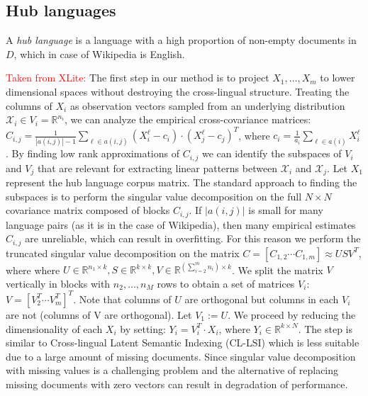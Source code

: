 \documentclass[twoside,11pt]{article}
\newcommand{\oldText}[1]{\textcolor{red}{#1:}\color{blue}}
\newcommand{\RR}{\mathbb{R}}
\begin{document}
\subsection{Hub languages}

A \emph{hub language} is a language with a high proportion of non-empty documents in $D$, which in case of Wikipedia is English.

{\oldText{Taken from XLite}
The first step in our method is to project $X_1, \ldots, X_m$ to lower dimensional spaces without destroying the cross-lingual structure. Treating the columns of $X_i$ as observation vectors sampled from an underlying distribution $\mathcal{X}_i \in V_i = \RR^{n_i}$, we can analyze the empirical cross-covariance matrices: $C_{i,j} = \frac{1}{|a(i,j)|-1 }\sum_{\ell \in a(i,j)} (X_i^{\ell} - c_i)\cdot (X_j^{\ell} - c_j)^T$, where $c_i = \frac{1}{a_i} \sum_{\ell \in a(i)}X_i^{\ell}$. By finding low rank approximations of $C_{i,j}$ we can identify the subspaces of $V_i$ and $V_j$ that are relevant for extracting linear patterns between $\mathcal{X}_i$ and $\mathcal{X}_j$. Let $X_1$ represent the hub language corpus matrix. The standard approach to finding the subspaces is to perform the singular value decomposition on the full $N \times N$ covariance matrix composed of blocks $C_{i,j}$. If $|a(i,j)|$ is small for many language pairs (as it is in the case of Wikipedia), then many empirical estimates $C_{i,j}$ are unreliable, which can result in overfitting. For this reason we perform the truncated singular value decomposition on the matrix $C = [C_{1,2}  \cdots  C_{1,m}] \approx U S V^T$, where where $U \in \RR^{n_1 \times k}, S \in \RR^{k \times k}, V \in \RR^{(\sum_{i=2}^m n_i) \times k}$. We split the matrix $V$ vertically in blocks with $n_2, \ldots, n_M$ rows to obtain a set of matrices $V_i$: $V = [V_2^T  \cdots  V_m^T]^T$. Note that columns of $U$ are orthogonal but columns in each $V_i$ are not (columns of V are orthogonal). Let $V_1 := U$. We proceed by reducing the dimensionality of each $X_i$ by setting: $Y_i = V_i^T \cdot X_i$, where $Y_i \in \RR^{k\times N}$. The step is similar to Cross-lingual Latent Semantic Indexing (CL-LSI) \cite{lsi}\cite{cl_lsi} which is less suitable due to a large amount of missing documents. Since singular value decomposition with missing values is a challenging problem and the alternative of replacing missing documents with zero vectors can result in degradation of performance.

}
\end{document}
